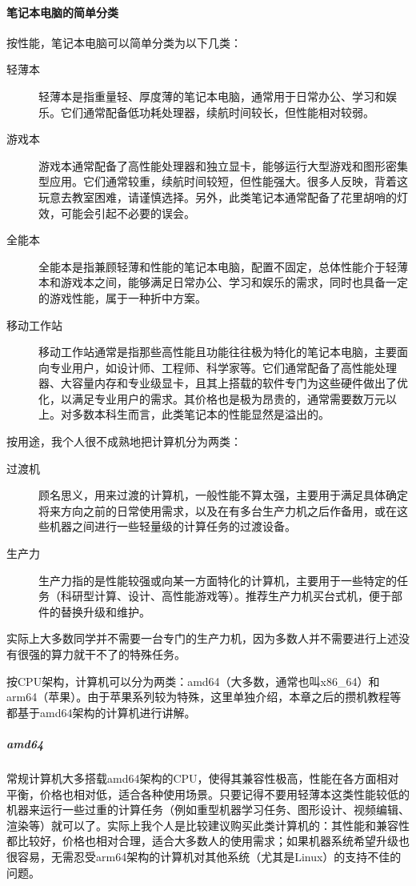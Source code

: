 \paragraph{笔记本电脑的简单分类}

按性能，笔记本电脑可以简单分类为以下几类：

\begin{description}
  \item[轻薄本] 轻薄本是指重量轻、厚度薄的笔记本电脑，通常用于日常办公、学习和娱乐。它们通常配备低功耗处理器，续航时间较长，但性能相对较弱。
  \item[游戏本] 游戏本通常配备了高性能处理器和独立显卡，能够运行大型游戏和图形密集型应用。它们通常较重，续航时间较短，但性能强大。很多人反映，背着这玩意去教室困难，请谨慎选择。另外，此类笔记本通常配备了花里胡哨的灯效，可能会引起不必要的误会。
  \item[全能本] 全能本是指兼顾轻薄和性能的笔记本电脑，配置不固定，总体性能介于轻薄本和游戏本之间，能够满足日常办公、学习和娱乐的需求，同时也具备一定的游戏性能，属于一种折中方案。
  \item[移动工作站] 移动工作站通常是指那些高性能且功能往往极为特化的笔记本电脑，主要面向专业用户，如设计师、工程师、科学家等。它们通常配备了高性能处理器、大容量内存和专业级显卡，且其上搭载的软件专门为这些硬件做出了优化，以满足专业用户的需求。其价格也是极为昂贵的，通常需要数万元以上。对多数本科生而言，此类笔记本的性能显然是溢出的。 
\end{description}

按用途，我个人很不成熟地把计算机分为两类：
\begin{description}
  \item[过渡机] 顾名思义，用来过渡的计算机，一般性能不算太强，主要用于满足具体确定将来方向之前的日常使用需求，以及在有多台生产力机之后作备用，或在这些机器之间进行一些轻量级的计算任务的过渡设备。
  \item[生产力] 生产力指的是性能较强或向某一方面特化的计算机，主要用于一些特定的任务（科研型计算、设计、高性能游戏等）。推荐生产力机买台式机，便于部件的替换升级和维护。
\end{description}
实际上大多数同学并不需要一台专门的生产力机，因为多数人并不需要进行上述没有很强的算力就干不了的特殊任务。

按CPU架构，计算机可以分为两类：amd64（大多数，通常也叫x86\_64）和arm64（苹果）。由于苹果系列较为特殊，这里单独介绍，本章之后的攒机教程等都基于amd64架构的计算机进行讲解。

\subparagraph{amd64} 常规计算机大多搭载amd64架构的CPU，使得其兼容性极高，性能在各方面相对平衡，价格也相对低，适合各种使用场景。只要记得不要用轻薄本这类性能较低的机器来运行一些过重的计算任务（例如重型机器学习任务、图形设计、视频编辑、渲染等）就可以了。实际上我个人是比较建议购买此类计算机的：其性能和兼容性都比较好，价格也相对合理，适合大多数人的使用需求；如果机器系统希望升级也很容易，无需忍受arm64架构的计算机对其他系统（尤其是Linux）的支持不佳的问题。

